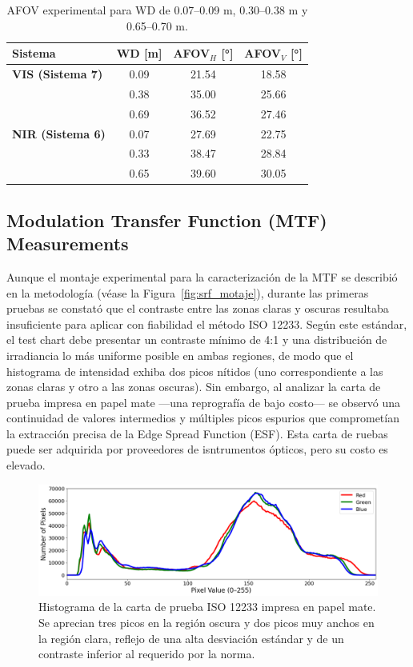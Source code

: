      \begin{table}[H]
       \centering
       \caption{AFOV experimental para WD de 0.07–0.09 m, 0.30–0.38 m y 0.65–0.70 m.}
       \label{tab:afov_exp}
       \begin{tabular}{lccc}
         \toprule
         Sistema & WD [m] & AFOV$_H$ [°] & AFOV$_V$ [°] \\
         \midrule
         \textbf{VIS (Sistema 7)} 
           & 0.09 & 21.54 & 18.58 \\
           & 0.38 & 35.00 & 25.66 \\
           & 0.69 & 36.52 & 27.46 \\
         \midrule
         \textbf{NIR (Sistema 6)} 
           & 0.07 & 27.69 & 22.75 \\
           & 0.33 & 38.47 & 28.84 \\
           & 0.65 & 39.60 & 30.05 \\
         \bottomrule
       \end{tabular}
     \end{table}
    
     \subsection{Modulation Transfer Function (MTF) Measurements}
      \label{sec:mtf_results}
      Aunque el montaje experimental para la caracterización de la MTF se describió en la metodología (véase la Figura~\ref{fig:srf_motaje}), durante las primeras pruebas se constató que el contraste entre las zonas claras y oscuras resultaba insuficiente para aplicar con fiabilidad el método ISO 12233. Según este estándar, el test chart debe presentar un contraste mínimo de 4:1 y una distribución de irradiancia lo más uniforme posible en ambas regiones, de modo que el histograma de intensidad exhiba dos picos nítidos (uno correspondiente a las zonas claras y otro a las zonas oscuras). Sin embargo, al analizar la carta de prueba impresa en papel mate —una reprografía de bajo costo— se observó una continuidad de valores intermedios y múltiples picos espurios que comprometían la extracción precisa de la Edge Spread Function (ESF). Esta carta de ruebas puede ser adquirida por proveedores de isntrumentos ópticos, pero su costo es elevado.\\

      \begin{figure}[h]
          \centering
          \includegraphics[width=0.7\linewidth]{Figures/C4/MTF_chart_hist.png}
          \caption{Histograma de la carta de prueba ISO 12233 impresa en papel mate. Se aprecian tres picos en la región oscura y dos picos muy anchos en la región clara, reflejo de una alta desviación estándar y de un contraste inferior al requerido por la norma.}
          \label{fig:histogram_iso12233}
      \end{figure}
      
